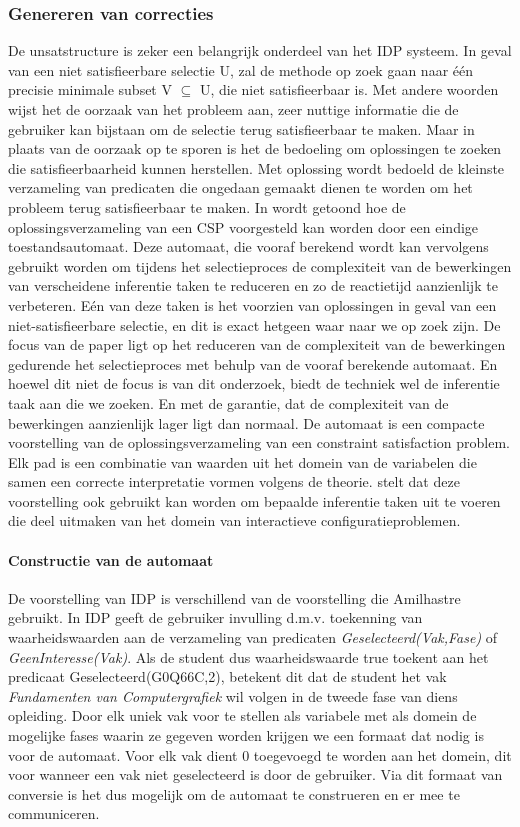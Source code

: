 \subsubsection{Genereren van correcties}
De unsatstructure is zeker een belangrijk onderdeel van het IDP systeem. In geval van een niet satisfieerbare selectie U, zal de methode op zoek gaan naar \'{e}\'{e}n precisie minimale subset V $\subseteq$ U, die niet satisfieerbaar is. Met andere woorden wijst het de oorzaak van het probleem aan, zeer nuttige informatie die de gebruiker kan bijstaan om de selectie terug satisfieerbaar te maken. Maar in plaats van de oorzaak op te sporen is het de bedoeling om oplossingen te zoeken die satisfieerbaarheid kunnen herstellen. Met oplossing wordt bedoeld de kleinste verzameling van predicaten die ongedaan gemaakt dienen te worden om het probleem terug satisfieerbaar te maken. In \citet{amilhastre2002consistency} wordt getoond hoe de oplossingsverzameling van een CSP voorgesteld kan worden door een eindige toestandsautomaat. Deze automaat, die vooraf berekend wordt kan vervolgens gebruikt worden om tijdens het selectieproces de complexiteit van de bewerkingen van verscheidene inferentie taken te reduceren en zo de reactietijd aanzienlijk te verbeteren. E\'{e}n van deze taken is het voorzien van oplossingen in geval van een niet-satisfieerbare selectie, en dit is exact hetgeen waar naar we op zoek zijn. De focus van de paper ligt op het reduceren van de complexiteit van de bewerkingen gedurende het selectieproces met behulp van de vooraf berekende automaat. En hoewel dit niet de focus is van dit onderzoek, biedt de techniek wel de inferentie taak aan die we zoeken. En met de garantie, dat de complexiteit van de bewerkingen aanzienlijk lager ligt dan normaal. De automaat is een compacte voorstelling van de oplossingsverzameling van een constraint satisfaction problem. Elk pad is een combinatie van waarden uit het domein van de variabelen die samen een correcte interpretatie vormen volgens de theorie. \citet{amilhastre2002consistency} stelt dat deze voorstelling ook gebruikt kan worden om bepaalde inferentie taken uit te voeren die deel uitmaken van het domein van interactieve configuratieproblemen. 

\paragraph{Constructie van de automaat}
De voorstelling van IDP is verschillend van de voorstelling die Amilhastre gebruikt. In IDP geeft de gebruiker invulling d.m.v. toekenning van waarheidswaarden aan de verzameling van predicaten \textit{Geselecteerd(Vak,Fase)} of \textit{GeenInteresse(Vak)}. Als de student dus waarheidswaarde true toekent aan het predicaat Geselecteerd(G0Q66C,2), betekent dit dat de student het vak \textit{Fundamenten van Computergrafiek} wil volgen in de tweede fase van diens opleiding. Door elk uniek vak voor te stellen als variabele met als domein de mogelijke fases waarin ze gegeven worden krijgen we een formaat dat nodig is voor de automaat. Voor elk vak dient 0 toegevoegd te worden aan het domein, dit voor wanneer een vak niet geselecteerd is door de gebruiker. Via dit formaat van conversie is het dus mogelijk om de automaat te construeren en er mee te communiceren.

